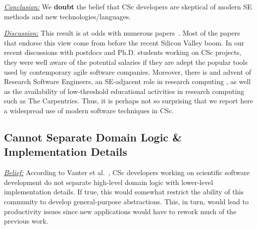\documentclass[conference,10pt]{IEEEtran}
\newenvironment{RQ}{\vspace{1mm}\begin{tcolorbox}[enhanced,width=3.4in,size=fbox,colback=red!5!white,drop shadow southeast,sharp corners]}{\end{tcolorbox}}
\begin{document}
\begin{RQ} 
\textit{\underline{Conclusion:}} We \textbf{doubt} the belief that 
CSc developers are skeptical of modern SE methods and new technologies/languages.
\end{RQ}

\noindent \textit{\underline{Discussion:}} This result is at odds
with numerous papers~\cite{basili08_hpc, carver07_environment, Prabhu11_cssurvey, kendall05_C, ragan14_pythoncs}. 
Most of the papers that endorse this view come from before the recent Silicon Valley boom. In our recent discussions with postdocs and Ph.D. students working on CSc projects,
they were well aware of the potential salaries if they are adept the popular tools used by contemporary agile software companies. Moreover, there is and advent of Research Software Engineers, an SE-adjacent role in research computing \cite{RSEs_roles}, as well as the availability of low-threshold educational activities in
research computing such as The Carpentries. Thus, it is perhaps not so surprising that we report here a widespread use of modern software techniques in CSc.
 


\subsection{Cannot Separate Domain Logic \& Implementation Details} 






\noindent \textit{\underline{Belief:}} 
According to Vanter et al.~\cite{faulk09_secs},
CSc developers working on scientific software development do not separate high-level domain logic with
lower-level implementation details. If true, this would somewhat restrict the ability
of this community to develop general-purpose abstractions. This, in turn, would lead
to productivity issues since new applications would have to rework much of the previous
work. 
\end{document}
